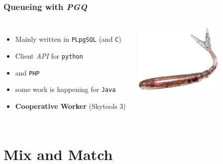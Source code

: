 \documentclass{beamer}
\begin{document}
\begin{frame}[fragile]
  \frametitle{Queueing with \textit{PGQ}}

  \linebreak

\begin{columns}[c]

  \begin{itemize}
   \item Mainly written in \texttt{PLpgSQL} (and \texttt{C})
   \item Client \textit{API} for \texttt{python}
   \item and \texttt{PHP}
   \item some work is happening for \texttt{Java}
   \item \textbf{Cooperative Worker} (Skytools 3)
  \end{itemize}  


\includegraphics[height=9em]{drop-queue.png}
\end{columns}
\end{frame}

\section{Mix and Match}
\end{document}
